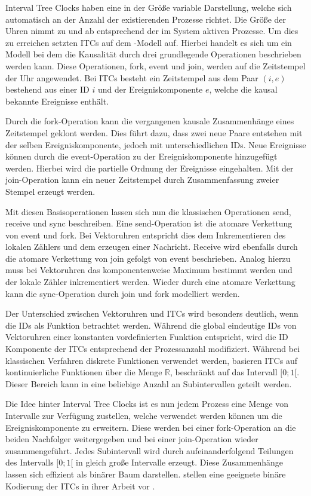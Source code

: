 Interval Tree Clocks haben eine in der Größe variable Darstellung, welche sich automatisch an der Anzahl der existierenden Prozesse richtet. Die Größe der Uhren nimmt zu und ab entsprechend der im System aktiven Prozesse.
Um dies zu erreichen setzten ITCs auf dem -Modell auf.
Hierbei handelt es sich um ein Modell bei dem die Kausalität durch drei grundlegende Operationen beschrieben werden kann.
Diese Operationen, fork, event und join, werden auf die Zeitstempel der Uhr angewendet.
Bei ITCs besteht ein Zeitstempel aus dem Paar $(i,e)$ bestehend aus einer ID $i$ und der Ereigniskomponente $e$, welche die kausal bekannte Ereignisse enthält.

Durch die fork-Operation kann die vergangenen kausale Zusammenhänge eines Zeitstempel geklont werden.
Dies führt dazu, dass zwei neue Paare entstehen mit der selben Ereigniskomponente, jedoch mit unterschiedlichen IDs.
Neue Ereignisse können durch die event-Operation zu der Ereigniskomponente hinzugefügt werden. 
Hierbei wird die partielle Ordnung der Ereignisse eingehalten.
Mit der join-Operation kann ein neuer Zeitstempel durch Zusammenfassung zweier Stempel erzeugt werden.

Mit diesen Basisoperationen lassen sich nun die klassischen Operationen send, receive und sync beschreiben.
Eine send-Operation ist die atomare Verkettung von event und fork.
Bei Vektoruhren entspricht dies dem Inkrementieren des lokalen Zählers und dem erzeugen einer Nachricht.
Receive wird ebenfalls durch die atomare Verkettung von join gefolgt von event beschrieben.
Analog hierzu muss bei Vektoruhren das komponentenweise Maximum bestimmt werden und der lokale Zähler inkrementiert werden.
Wieder durch eine atomare Verkettung kann die sync-Operation durch join und fork modelliert werden.

Der Unterschied zwischen Vektoruhren und ITCs wird besonders deutlich, wenn die IDs als Funktion betrachtet werden.
Während die global eindeutige IDs von Vektoruhren einer konstanten vordefinierten Funktion entspricht, wird die ID Komponente der ITCs entsprechend der Prozessanzahl modifiziert.
Während bei klassischen Verfahren diskrete Funktionen verwendet werden, basieren ITCs auf kontinuierliche Funktionen über die Menge $\mathbb{R}$, beschränkt auf das Intervall $[0;1[$.
Dieser Bereich kann in eine beliebige Anzahl an Subintervallen geteilt werden.

Die Idee hinter Interval Tree Clocks ist es nun jedem Prozess eine Menge von Intervalle zur Verfügung zustellen, welche verwendet werden können um die Ereigniskomponente zu erweitern.
Diese werden bei einer fork-Operation an die beiden Nachfolger weitergegeben und bei einer join-Operation wieder zusammengeführt.
Jedes Subintervall wird durch aufeinanderfolgend Teilungen des Intervalls $[0;1[$ in gleich große Intervalle erzeugt.
Diese Zusammenhänge lassen sich effizient als binärer Baum darstellen.
 stellen eine geeignete binäre Kodierung der ITCs in ihrer Arbeit vor \cite{almeida2008treeclocks}.

